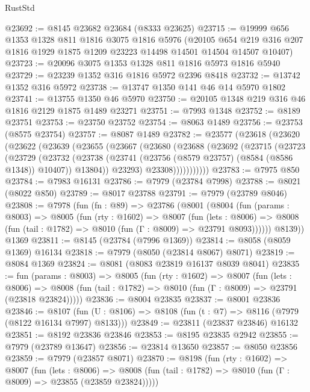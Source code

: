 \begin{lexlean}{RustStd}
\begin{coremodule}
@23692 := @8145 @23682 @23684 (@8333 @23625)
@23715 := @19999
    @656
    @1353
    @1328
    @811
    @1816
    @3075
    @1816
    @5976
    (@20105 @654 @219 @316 @207 @1816 @1929 @1875 @1209 @23223 @14498 @14501 @14504 @14507 @10407)
@23723 := @20096 @3075 @1353 @1328 @811 @1816 @5973 @1816 @5940
@23729 := @23239 @1352 @316 @1816 @5972 @2396 @8418
@23732 := @13742 @1352 @316 @5972
@23738 := @13747 @1350 @141 @46 @14 @5970 @1802
@23741 := @13755 @1350 @46 @5970
@23750 := @20105 @1348 @219 @316 @46 @1816 @2129 @1875 @1489 @23271
@23751 := @7993 @1348
@23752 := @8189 @23751
@23753 := @23750 @23752
@23754 := @8063 @1489
@23756 := @23753 (@8575 @23754)
@23757 := @8087 @1489
@23782 := @23577
    (@23618
      (@23620
        (@23622
          (@23639
            (@23655
              (@23667
                (@23680
                  (@23688
                    (@23692
                      (@23715
                        (@23723
                          (@23729
                            (@23732
                              (@23738
                                (@23741 (@23756 (@8579 @23757) (@8584 (@8586 @1348)) @10407))
                                @13804))
                            @23293)
                          @23308)))))))))))
@23783 := @7975 @850
@23784 := @7983 @16131
@23786 := @7979 (@23784 @7998)
@23788 := @8021 (@8022 @850)
@23789 := @8017 @23788
@23791 := @7979 (@23789 @8046)
@23808 := @7978
    (fun (fn : @89) =>
    @23786
      (@8001
        (@8004
          (fun (params : @8003) =>
          @8005
            (fun (rty : @1602) =>
            @8007
              (fun (lets : @8006) =>
              @8008 (fun (tail : @1782) => @8010 (fun (Γ : @8009) => @23791 @8093))))))
        @8139))
    @1369
@23811 := @8145 (@23784 (@7996 @1369))
@23814 := @8058 (@8059 @1369) @16134
@23818 := @7979 (@8050 (@23814 @8067) @8071)
@23819 := @8084 @1369
@23824 := @8081 (@8083 @23819 @16137 @8039 @8041)
@23835 := fun (params : @8003) =>
  @8005
    (fun (rty : @1602) =>
    @8007
      (fun (lets : @8006) =>
      @8008 (fun (tail : @1782) => @8010 (fun (Γ : @8009) => @23791 (@23818 @23824)))))
@23836 := @8004 @23835
@23837 := @8001 @23836
@23846 := @8107
    (fun (U : @8106) => @8108 (fun (t : @7) => @8116 (@7979 (@8122 @16134 @7997) @8133)))
@23849 := @23811 (@23837 @23846) @16132
@23851 := @8192 @23836 @23846
@23853 := @8195 @23835 @2942
@23855 := @7979 (@23789 @13647)
@23856 := @23814 @13650
@23857 := @8050 @23856
@23859 := @7979 (@23857 @8071)
@23870 := @8198
    (fun (rty : @1602) =>
    @8007
      (fun (lets : @8006) =>
      @8008 (fun (tail : @1782) => @8010 (fun (Γ : @8009) => @23855 (@23859 @23824)))))

\end{coremodule}
\end{lexlean}
